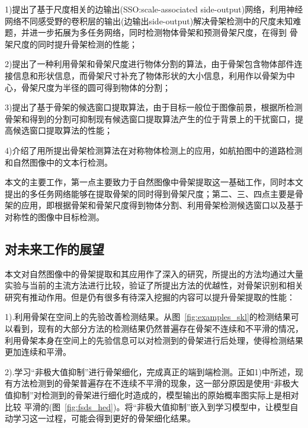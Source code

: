 \documentclass[UTF8]{ctexart}
\numberwithin{equation}{section} %
\numberwithin{table}{section} %
\begin{document}
1)提出了基于尺度相关的边输出(SSO:scale-associated side-output)网络，利用神经网络不同感受野的卷积层的输出(边输出side-output)解决骨架检测中的尺度未知难题，并进一步拓展为多任务网络，同时检测物体骨架和预测骨架尺度，在得到
骨架尺度的同时提升骨架检测的性能；

2)提出了一种利用骨架和骨架尺度进行物体分割的算法，由于骨架包含物体部件连接信息和形状信息，而骨架尺寸补充了物体形状的大小信息，利用作以骨架为中心，骨架尺度为半径的圆可得到物体的分割；

3)提出了基于骨架的候选窗口提取算法，由于目标一般位于图像前景，根据所检测骨架和得到的分割可抑制现有候选窗口提取算法产生的位于背景上的干扰窗口，提高候选窗口提取算法的性能；

4)介绍了用所提出骨架检测算法在对称物体检测上的应用，如航拍图中的道路检测和自然图像中的文本行检测。

本文的主要工作，第一点主要致力于自然图像中骨架提取这一基础工作，同时本文提出的多任务网络能够在提取骨架的同时得到骨架尺度；第二、三、四点主要是骨架的应用，即根据骨架和骨架尺度得到物体分割、利用骨架检测候选窗口以及基于对称性的图像中目标检测。

\subsection{对未来工作的展望}
本文对自然图像中的骨架提取和其应用作了深入的研究，所提出的方法均通过大量实验与当前的主流方法进行比较，验证了所提出方法的优越性，对骨架识别和相关研究有推动作用。但是仍有很多有待深入挖掘的内容可以提升骨架提取的性能：

1).利用骨架在空间上的先验改善检测结果。从图~\ref{fig:examples_skl}的检测结果可以看到，现有的大部分方法的检测结果仍然普遍存在骨架不连续和不平滑的情况，利用骨架本身在空间上的先验信息可以对检测到的骨架进行后处理，使得检测结果
更加连续和平滑。

2).学习“非极大值抑制”进行骨架细化，完成真正的端到端检测。正如1)中所述，现有方法检测到的骨架普遍存在不连续不平滑的现象，这一部分原因是使用“非极大值抑制”对检测到的骨架进行细化时造成的，模型输出的原始概率图实际上是相对比较
平滑的(图~\ref{fig:fsds_hed})。将“非极大值抑制”嵌入到学习模型中，让模型自动学习这一过程，可能会得到更好的骨架细化结果。

\pagebreak



\pagebreak
\end{document}
